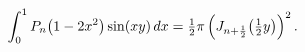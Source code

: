 \[\int_{0}^{1}\mathop{P_{n}\/}\nolimits\!\left(1-2x^{2}\right)\mathop{\sin\/}%
\nolimits\!\left(xy\right)dx=\tfrac{1}{2}\pi\left(\mathop{J_{n+\frac{1}{2}}\/}%
\nolimits\!\left(\tfrac{1}{2}y\right)\right)^{2}.\]